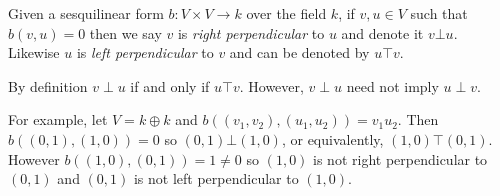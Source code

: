 \documentclass[12pt]{article}
\begin{document}
Given a sesquilinear form $b:V\times V\rightarrow k$ over the field $k$, if $v,u\in V$ such that $b(v,u)=0$ then we say $v$ is \emph{right perpendicular} to $u$ and denote it $v\bot u$.  Likewise $u$ is \emph{left perpendicular} to $v$ and can be denoted by $u\top v$.  

By definition $v\perp u$ if and only if $u\top v$.  However, $v\perp u$ need not imply $u\perp v$.

For example, let $V=k\oplus k$ and $b( (v_1,v_2), (u_1,u_2))=v_1 u_2$.  Then
$b((0,1),(1,0))=0$ so $(0,1)\bot (1,0)$, or equivalently, $(1,0)\top (0,1)$.
However $b((1,0),(0,1))=1\neq 0$ so $(1,0)$ is not right perpendicular to $(0,1)$ and $(0,1)$ is not left perpendicular to $(1,0)$.
\end{document}
